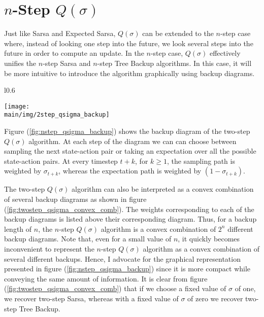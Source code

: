 \section{$n$-Step $Q(\sigma)$}

Just like Sarsa and Expected Sarsa, $Q(\sigma)$ can be extended to the $n$-step case where, instead of looking one step into the future, we look several steps into the future in order to compute an update.
In the $n$-step case, $Q(\sigma)$ effectively unifies the $n$-step Sarsa and $n$-step Tree Backup algorithms.
In this case, it will be more intuitive to introduce the algorithm graphically using backup diagrams.

\begin{wrapfigure}{l}{0.6\textwidth}
  \begin{center}
    \texttt{[image: \\main/img/2step\_qsigma\_backup]}
  \end{center}
  \caption{Two-Step $Q(\sigma)$ Backup Diagram}
  \label{fig:nstep_qsigma_backup}
\end{wrapfigure}

Figure (\ref{fig:nstep_qsigma_backup}) shows the backup diagram of the two-step $Q(\sigma)$ algorithm.
At each step of the diagram we can can choose between sampling the next state-action pair or taking an expectation over all the possible state-action pairs.
At every timestep $t + k$, for $k \geq 1$, the sampling path is weighted by $\sigma_{t + k}$, whereas the expectation path is weighted by $(1-\sigma_{t + k})$.

The two-step $Q(\sigma)$ algorithm can also be interpreted as a convex combination of several backup diagrams as shown in figure (\ref{fig:twostep_qsigma_convex_comb}).
The weights corresponding to each of the backup diagrams is listed above their corresponding diagram.
Thus, for a backup length of $n$, the $n$-step $Q(\sigma)$ algorithm is a convex combination of $2^n$ different backup diagrams.
Note that, even for a small value of $n$, it quickly becomes inconvenient to represent the $n$-step $Q(\sigma)$ algorithm as a convex combination of several different backups.
Hence, I advocate for the graphical representation presented in figure (\ref{fig:nstep_qsigma_backup}) since it is more compact while conveying the same amount of information.
It is clear from figure (\ref{fig:twostep_qsigma_convex_comb}) that if we choose a fixed value of $\sigma$ of one, we recover two-step Sarsa, whereas with a fixed value of $\sigma$ of zero we recover two-step Tree Backup.


